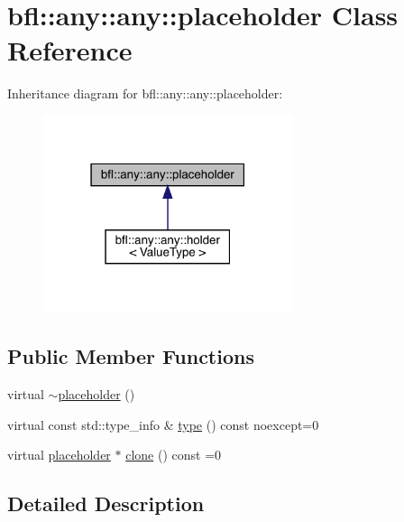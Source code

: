 \hypertarget{classbfl_1_1any_1_1any_1_1placeholder}{}\section{bfl\+:\+:any\+:\+:any\+:\+:placeholder Class Reference}
\label{classbfl_1_1any_1_1any_1_1placeholder}


Inheritance diagram for bfl\+:\+:any\+:\+:any\+:\+:placeholder\+:
\nopagebreak
\begin{figure}[H]
\begin{center}
\leavevmode
\includegraphics[width=207pt]{classbfl_1_1any_1_1any_1_1placeholder__inherit__graph}
\end{center}
\end{figure}
\subsection*{Public Member Functions}
\begin{DoxyCompactItemize}
\item 
virtual \mbox{\hyperlink{classbfl_1_1any_1_1any_1_1placeholder_a1ca3b3d60d9c7d6749759165b28a8111}{$\sim$placeholder}} ()
\item 
virtual const std\+::type\+\_\+info \& \mbox{\hyperlink{classbfl_1_1any_1_1any_1_1placeholder_a3bbcdbccbceacccd08befecaade4e510}{type}} () const noexcept=0
\item 
virtual \mbox{\hyperlink{classbfl_1_1any_1_1any_1_1placeholder}{placeholder}} $\ast$ \mbox{\hyperlink{classbfl_1_1any_1_1any_1_1placeholder_a6dba5b12e7e4a4247f03cfdb762a3f58}{clone}} () const =0
\end{DoxyCompactItemize}


\subsection{Detailed Description}


